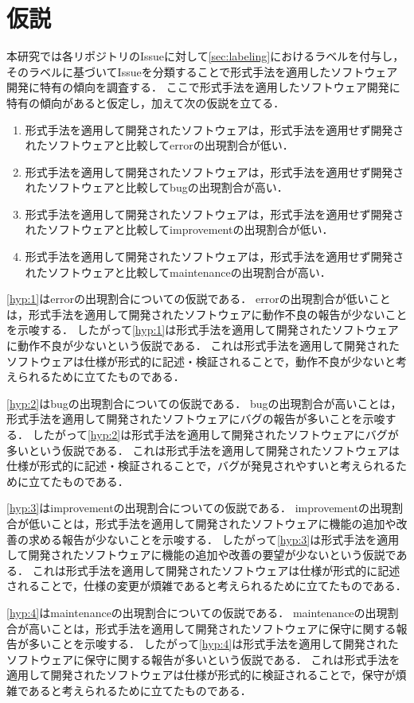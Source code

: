 \documentclass[main]{subfiles}
\begin{document}
\chapter{仮説}
\label{chap:hypothesis}

本研究では各リポジトリのIssueに対して\ref{sec:labeling}におけるラベルを付与し，そのラベルに基づいてIssueを分類することで形式手法を適用したソフトウェア開発に特有の傾向を調査する．
ここで形式手法を適用したソフトウェア開発に特有の傾向があると仮定し，加えて次の仮説を立てる．

\begin{enumerate}[label=仮説\arabic*.]
	\item \label{hyp:1} 形式手法を適用して開発されたソフトウェアは，形式手法を適用せず開発されたソフトウェアと比較してerrorの出現割合が低い．
	\item \label{hyp:2} 形式手法を適用して開発されたソフトウェアは，形式手法を適用せず開発されたソフトウェアと比較してbugの出現割合が高い．
	\item \label{hyp:3} 形式手法を適用して開発されたソフトウェアは，形式手法を適用せず開発されたソフトウェアと比較してimprovementの出現割合が低い．
	\item \label{hyp:4} 形式手法を適用して開発されたソフトウェアは，形式手法を適用せず開発されたソフトウェアと比較してmaintenanceの出現割合が高い．
\end{enumerate}

\ref{hyp:1}はerrorの出現割合についての仮説である．
errorの出現割合が低いことは，形式手法を適用して開発されたソフトウェアに動作不良の報告が少ないことを示唆する．
したがって\ref{hyp:1}は形式手法を適用して開発されたソフトウェアに動作不良が少ないという仮説である．
これは形式手法を適用して開発されたソフトウェアは仕様が形式的に記述・検証されることで，動作不良が少ないと考えられるために立てたものである．

\ref{hyp:2}はbugの出現割合についての仮説である．
bugの出現割合が高いことは，形式手法を適用して開発されたソフトウェアにバグの報告が多いことを示唆する．
したがって\ref{hyp:2}は形式手法を適用して開発されたソフトウェアにバグが多いという仮説である．
これは形式手法を適用して開発されたソフトウェアは仕様が形式的に記述・検証されることで，バグが発見されやすいと考えられるために立てたものである．

\ref{hyp:3}はimprovementの出現割合についての仮説である．
improvementの出現割合が低いことは，形式手法を適用して開発されたソフトウェアに機能の追加や改善の求める報告が少ないことを示唆する．
したがって\ref{hyp:3}は形式手法を適用して開発されたソフトウェアに機能の追加や改善の要望が少ないという仮説である．
これは形式手法を適用して開発されたソフトウェアは仕様が形式的に記述されることで，仕様の変更が煩雑であると考えられるために立てたものである．

\ref{hyp:4}はmaintenanceの出現割合についての仮説である．
maintenanceの出現割合が高いことは，形式手法を適用して開発されたソフトウェアに保守に関する報告が多いことを示唆する．
したがって\ref{hyp:4}は形式手法を適用して開発されたソフトウェアに保守に関する報告が多いという仮説である．
これは形式手法を適用して開発されたソフトウェアは仕様が形式的に検証されることで，保守が煩雑であると考えられるために立てたものである．
\end{document}
